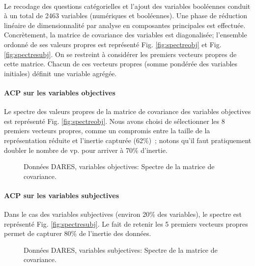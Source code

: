 \documentclass[11pt,fleqn,a4paper,openany,frenchb]{book} %
\begin{document}
\paragraph{}
Le recodage des questions catégorielles et l'ajout des variables booléennes conduit à un total de 2463 variables (numériques et booléennes). Une phase de réduction linéaire de dimensionnalité par analyse en composantes principales est effectuée. Concrètement, la matrice de covariance des variables est diagonalisée; l'ensemble ordonné de ses valeurs propres est représenté Fig. \ref{fig:spectreobj} et Fig. \ref{fig:spectresubj}. On se restreint à considérer les premiers vecteurs propres de cette matrice. Chacun de ces vecteurs propres (somme pondérée des variables initiales) définit une variable agrégée. 

\paragraph{ACP sur les variables objectives\\}
Le spectre des valeurs propres de la matrice de covariance des variables objectives est représenté Fig. \ref{fig:spectreobj}.  Nous avons choisi de sélectionner les 8 premiers vecteurs propres, comme un compromis entre la taille de la représentation réduite et l'inertie capturée (62\%)~; notons qu'il faut pratiquement doubler le nombre de vp. pour arriver à 70\% d'inertie. 

\begin{figure}[!h]
    \centering
  \hspace{2pt}
  \caption{Données DARES, variables objectives: Spectre de la matrice de covariance.}
\end{figure}
  

\paragraph{ACP sur les variables subjectives\\}
Dans le cas des variables subjectives (environ 20\% des variables), le spectre est représenté Fig. \ref{fig:spectresubj}. Le fait de retenir les 5 premiers vecteurs propres permet de capturer 80\% de l'inertie des données.

\begin{figure}[!h]
    \centering
  \hspace{2pt}
  \caption{Données DARES, variables subjectives: Spectre de la matrice de covariance.}
\end{figure}
\end{document}
